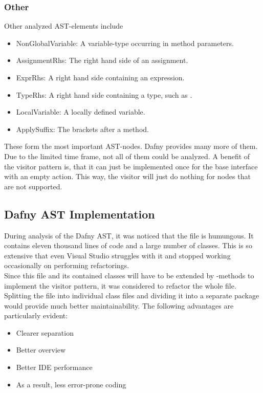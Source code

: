 \subsubsection{Other}
Other analyzed AST-elements include
\begin{itemize}
   \item NonGlobalVariable: A variable-type occurring in method parameters.
   \item AssignmentRhs: The right hand side of an assignment.
   \item ExprRhs: A right hand side containing an expression.
   \item TypeRhs: A right hand side containing a type, such as .
   \item LocalVariable: A locally defined variable.
   \item ApplySuffix: The brackets after a method.
\end{itemize}

These form the most important AST-nodes.
Dafny provides many more of them.
Due to the limited time frame, not all of them could be analyzed.
A benefit of the visitor pattern is, that it can just be implemented once for the base interface  with an empty action.
This way, the visitor will just do nothing for nodes that are not supported.

\subsection{Dafny AST Implementation}
During analysis of the Dafny AST, it was noticed that the file  is humungous.
It contains eleven thousand lines of code and a large number of classes.
This is so extensive that even Visual Studio struggles with it and stopped working occasionally on performing refactorings.\\

Since this file and its contained classes will have to be extended by -methods
to implement the visitor pattern, it was considered to refactor the whole file.\\

Splitting the file into individual class files and dividing it into a separate package would provide much better maintainability.
The following advantages are particularly evident:
\begin{itemize}
    \item Clearer separation
    \item Better overview
    \item Better IDE performance
    \item As a result, less error-prone coding
\end{itemize}

